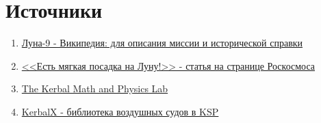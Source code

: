 \section*{Источники}
\begin{enumerate}
	\item \href{https://ru.wikipedia.org/wiki/%D0%9B%D1%83%D0%BD%D0%B0-9}{Луна-9 - Википедия: для описания миссии и исторической справки}
	\item \href{https://www.roscosmos.ru/29868/#1}{<<Есть мягкая посадка на Луну!>> - статья на странице Роскосмоса}
	\item \href{https://sites.google.com/view/kspmath/home}{The Kerbal Math and Physics Lab}
	\item \href{https://kerbalx.com/}{KerbalX - библиотека воздушных судов в KSP}
\end{enumerate}

